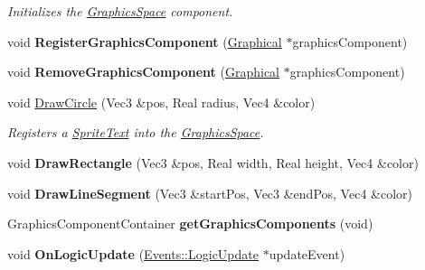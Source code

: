 \begin{DoxyCompactItemize}
\begin{DoxyCompactList}\small\item\em Initializes the \hyperlink{classDCEngine_1_1Components_1_1GraphicsSpace}{Graphics\-Space} component. \end{DoxyCompactList}\item 
\hypertarget{classDCEngine_1_1Components_1_1GraphicsSpace_a9ebb109bd07d6b50df996f1329a3d589}{void {\bfseries Register\-Graphics\-Component} (\hyperlink{classDCEngine_1_1Components_1_1Graphical}{Graphical} $\ast$graphics\-Component)}\label{classDCEngine_1_1Components_1_1GraphicsSpace_a9ebb109bd07d6b50df996f1329a3d589}

\item 
\hypertarget{classDCEngine_1_1Components_1_1GraphicsSpace_a388bcb2b16ae7de4847fcb22f7e0ec1c}{void {\bfseries Remove\-Graphics\-Component} (\hyperlink{classDCEngine_1_1Components_1_1Graphical}{Graphical} $\ast$graphics\-Component)}\label{classDCEngine_1_1Components_1_1GraphicsSpace_a388bcb2b16ae7de4847fcb22f7e0ec1c}

\item 
void \hyperlink{classDCEngine_1_1Components_1_1GraphicsSpace_a879de24d73804a3e72a17ac6366e0d32}{Draw\-Circle} (Vec3 \&pos, Real radius, Vec4 \&color)
\begin{DoxyCompactList}\small\item\em Registers a \hyperlink{classDCEngine_1_1Components_1_1SpriteText}{Sprite\-Text} into the \hyperlink{classDCEngine_1_1Components_1_1GraphicsSpace}{Graphics\-Space}. \end{DoxyCompactList}\item 
\hypertarget{classDCEngine_1_1Components_1_1GraphicsSpace_a22ee9e79cb0a6ebdc744e6b0309f9dd8}{void {\bfseries Draw\-Rectangle} (Vec3 \&pos, Real width, Real height, Vec4 \&color)}\label{classDCEngine_1_1Components_1_1GraphicsSpace_a22ee9e79cb0a6ebdc744e6b0309f9dd8}

\item 
\hypertarget{classDCEngine_1_1Components_1_1GraphicsSpace_a7df8df16b240039e7e2e53d5f23d0405}{void {\bfseries Draw\-Line\-Segment} (Vec3 \&start\-Pos, Vec3 \&end\-Pos, Vec4 \&color)}\label{classDCEngine_1_1Components_1_1GraphicsSpace_a7df8df16b240039e7e2e53d5f23d0405}

\item 
\hypertarget{classDCEngine_1_1Components_1_1GraphicsSpace_aa087ac15d2b4b8c08234d07fcbcbb105}{Graphics\-Component\-Container {\bfseries get\-Graphics\-Components} (void)}\label{classDCEngine_1_1Components_1_1GraphicsSpace_aa087ac15d2b4b8c08234d07fcbcbb105}

\item 
\hypertarget{classDCEngine_1_1Components_1_1GraphicsSpace_a605844447b72d8716a33c815f3d71d12}{void {\bfseries On\-Logic\-Update} (\hyperlink{classDCEngine_1_1Events_1_1LogicUpdate}{Events\-::\-Logic\-Update} $\ast$update\-Event)}\label{classDCEngine_1_1Components_1_1GraphicsSpace_a605844447b72d8716a33c815f3d71d12}

\end{DoxyCompactItemize}

